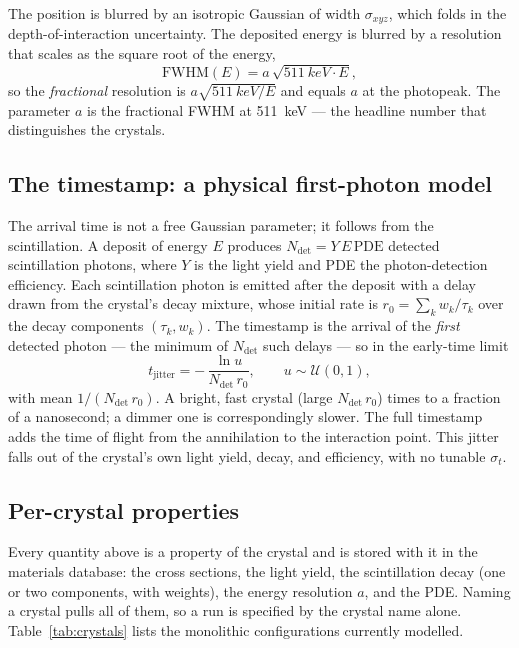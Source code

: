 \documentclass[11pt]{article}
\begin{document}
The position is blurred by an isotropic Gaussian of width $\sigma_{xyz}$, which folds in the
depth-of-interaction uncertainty. The deposited energy is blurred by a resolution that scales as
the square root of the energy,
\begin{equation}
  \mathrm{FWHM}(E) = a\,\sqrt{\SI{511}{keV}\cdot E},
\end{equation}
so the \emph{fractional} resolution is $a\sqrt{\SI{511}{keV}/E}$ and equals $a$ at the photopeak.
The parameter $a$ is the fractional FWHM at \SI{511}{keV} --- the headline number that distinguishes
the crystals.

\subsection{The timestamp: a physical first-photon model}

The arrival time is not a free Gaussian parameter; it follows from the scintillation. A deposit of
energy $E$ produces $N_{\mathrm{det}} = Y\,E\,\mathrm{PDE}$ detected scintillation photons, where
$Y$ is the light yield and PDE the photon-detection efficiency. Each scintillation photon is emitted
after the deposit with a delay drawn from the crystal's decay mixture, whose initial rate is
$r_0 = \sum_k w_k/\tau_k$ over the decay components $(\tau_k, w_k)$. The timestamp is the arrival of
the \emph{first} detected photon --- the minimum of $N_{\mathrm{det}}$ such delays --- so in the
early-time limit
\begin{equation}
  t_{\mathrm{jitter}} = -\,\frac{\ln u}{N_{\mathrm{det}}\,r_0}, \qquad u\sim\mathcal{U}(0,1),
\end{equation}
with mean $1/(N_{\mathrm{det}}\,r_0)$. A bright, fast crystal (large $N_{\mathrm{det}}\,r_0$) times
to a fraction of a nanosecond; a dimmer one is correspondingly slower. The full timestamp adds the
time of flight from the annihilation to the interaction point. This jitter falls out of the
crystal's own light yield, decay, and efficiency, with no tunable $\sigma_t$.

\subsection{Per-crystal properties}

Every quantity above is a property of the crystal and is stored with it in the materials database:
the cross sections, the light yield, the scintillation decay (one or two components, with weights),
the energy resolution $a$, and the PDE. Naming a crystal pulls all of them, so a run is specified by
the crystal name alone. Table~\ref{tab:crystals} lists the monolithic configurations currently
modelled.
\end{document}
